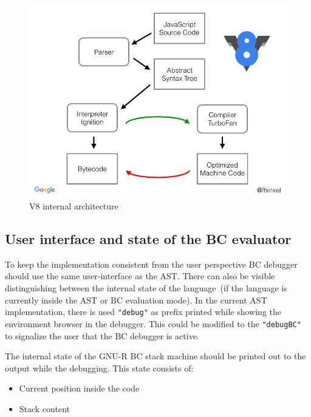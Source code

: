 \documentclass[thesis=M,english]{FITthesis}[2018/10/20]
\newcommand{\code}[1]{\texttt{#1}}
\begin{document}
\begin{figure}[!h]\centering
	\includegraphics[width=\textwidth]{v8-architecture}
	\caption{V8 internal architecture}\label{fig:ast-v8-architecture}
\end{figure}


\subsection{User interface and state of the BC evaluator}\label{user-interface-and-state-of-the-bc-eval}

To keep the implementation consistent from the user perspective BC debugger should use the same user-interface as the AST. There can also be visible distinguishing between the internal state of the language~(if the language is currently inside the AST or BC evaluation mode). In the current AST implementation, there is used
\code{"debug"} as prefix printed while showing the environment browser in the debugger. This could be modified to the \code{"debugBC"} to signalize the user that the BC debugger is active.

The internal state of the GNU-R BC stack machine should be printed out to the output while the debugging. This state consists of:

\begin{itemize}
	\item Current position inside the code
	\item Stack content
\end{itemize}
\end{document}
